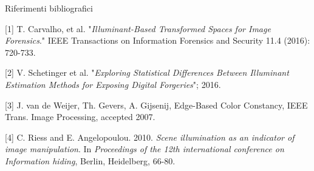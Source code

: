 \begin{tframe}{Riferimenti bibliografici}

\begin{small}


[1] T. Carvalho, et al. "\emph{Illuminant-Based Transformed Spaces for Image Forensics}." IEEE Transactions on Information Forensics and Security 11.4 (2016): 720-733.

\vspace{0.1in}

[2] V. Schetinger et al. "\emph{Exploring Statistical Differences Between Illuminant Estimation Methods for Exposing Digital Forgeries}"; 2016.

\vspace{0.1in}

[3] J. van de Weijer, Th. Gevers, A. Gijsenij, Edge-Based Color Constancy, IEEE Trans. Image Processing, accepted 2007. 

\vspace{0.1in}

[4] C. Riess and E. Angelopoulou. 2010. \emph{Scene illumination as an indicator of image manipulation}. In \emph{Proceedings of the 12th international conference on Information hiding}, Berlin, Heidelberg, 66-80.

\end{small}

\end{tframe}